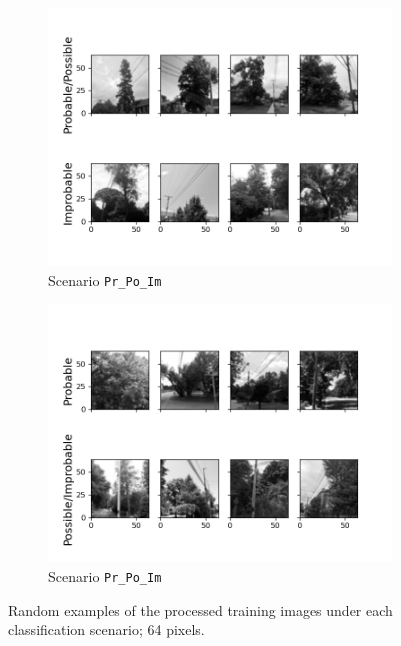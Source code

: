 \documentclass[Journal,letterpaper, SingleSpace, InsideFigs]{ascelike-new}
\begin{document}
\begin{figure}[h!]
  \begin{subfigure}[t]{.5\linewidth}
    \centering
    \includegraphics[width=\linewidth]{processed_input_images_PrPo_Im_64_px}
    \caption{Scenario \texttt{Pr\_Po\_Im}}
    \label{prpo_im_64}
  \end{subfigure}%
  \begin{subfigure}[t]{.5\linewidth}
    \centering
    \includegraphics[width=\linewidth]{processed_input_images_Pr_PoIm_64_px}
    \caption{Scenario \texttt{Pr\_Po\_Im}}
    \label{pr_poim_64}
  \end{subfigure}%

  \caption{Random examples of the processed training images under each classification scenario; 64 pixels.}
  \label{fig:processed_images}
\end{figure}
\end{document}
